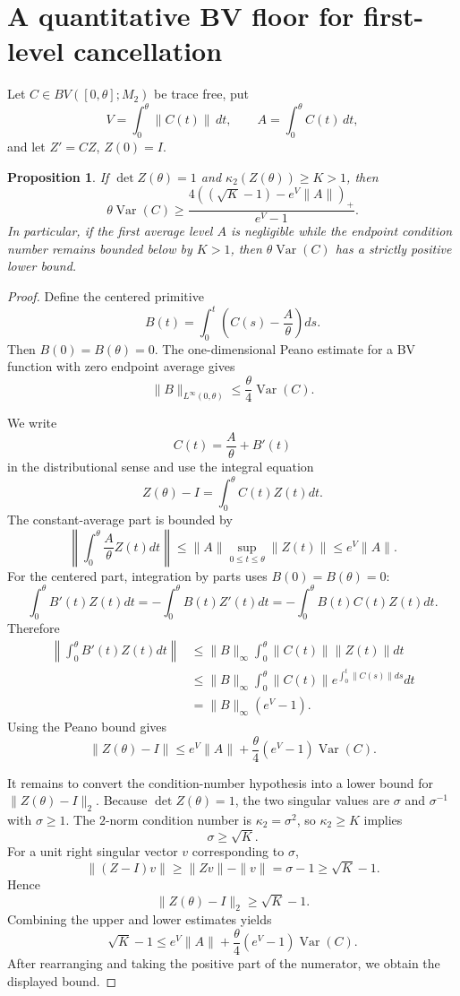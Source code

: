 \documentclass[11pt]{article}
\newtheorem{proposition}[theorem]{Proposition}
\theoremstyle{definition}\newtheorem{definition}[theorem]{Definition}
\theoremstyle{remark}\newtheorem{remark}[theorem]{Remark}
\begin{document}
\section{A quantitative BV floor for first-level cancellation}
Let $C\in BV([0,\theta];M_2)$ be trace free, put
\[
 V=\int_0^\theta\|C(t)\|\,dt,
 \qquad
 A=\int_0^\theta C(t)\,dt,
\]
and let $Z'=CZ$, $Z(0)=I$.

\begin{proposition}\label{prop:bv-floor}
If $\det Z(\theta)=1$ and $\kappa_2(Z(\theta))\ge K>1$, then
\[
\boxed{
\theta\operatorname{Var}(C)
\ge
\frac{4((\sqrt K-1)-e^V\|A\|)_+}{e^V-1}.
}
\]
In particular, if the first average level $A$ is negligible while the endpoint condition number remains bounded below by $K>1$, then $\theta\operatorname{Var}(C)$ has a strictly positive lower bound.
\end{proposition}
\begin{proof}
Define the centered primitive
\[
 B(t)=\int_0^t\left(C(s)-\frac A\theta\right)ds.
\]
Then $B(0)=B(\theta)=0$.  The one-dimensional Peano estimate for a BV function with zero endpoint average gives
\[
 \|B\|_{L^\infty(0,\theta)}
 \le\frac\theta4\operatorname{Var}(C).
\]

We write
\[
 C(t)=\frac A\theta+B'(t)
\]
in the distributional sense and use the integral equation
\[
 Z(\theta)-I=\int_0^\theta C(t)Z(t)dt.
\]
The constant-average part is bounded by
\[
 \left\|\int_0^\theta\frac A\theta Z(t)dt\right\|
 \le \|A\|\sup_{0\le t\le\theta}\|Z(t)\|
 \le e^V\|A\|.
\]
For the centered part, integration by parts uses $B(0)=B(\theta)=0$:
\[
 \int_0^\theta B'(t)Z(t)dt
 =-\int_0^\theta B(t)Z'(t)dt
 =-\int_0^\theta B(t)C(t)Z(t)dt.
\]
Therefore
\[
 \begin{aligned}
 \left\|\int_0^\theta B'(t)Z(t)dt\right\|
 &\le \|B\|_\infty
 \int_0^\theta\|C(t)\|\|Z(t)\|dt\\
 &\le \|B\|_\infty
 \int_0^\theta\|C(t)\|e^{\int_0^t\|C(s)\|ds}dt\\
 &=\|B\|_\infty(e^V-1).
 \end{aligned}
\]
Using the Peano bound gives
\[
 \|Z(\theta)-I\|
 \le e^V\|A\|
 +\frac\theta4(e^V-1)\operatorname{Var}(C).
\]

It remains to convert the condition-number hypothesis into a lower bound for $\|Z(\theta)-I\|_2$.  Because $\det Z(\theta)=1$, the two singular values are $\sigma$ and $\sigma^{-1}$ with $\sigma\ge1$.  The $2$-norm condition number is $\kappa_2=\sigma^2$, so $\kappa_2\ge K$ implies
\[
 \sigma\ge\sqrt K.
\]
For a unit right singular vector $v$ corresponding to $\sigma$,
\[
 \|(Z-I)v\|
 \ge \|Zv\|-\|v\|
 =\sigma-1
 \ge\sqrt K-1.
\]
Hence
\[
 \|Z(\theta)-I\|_2\ge\sqrt K-1.
\]
Combining the upper and lower estimates yields
\[
 \sqrt K-1
 \le e^V\|A\|
 +\frac\theta4(e^V-1)\operatorname{Var}(C).
\]
After rearranging and taking the positive part of the numerator, we obtain the displayed bound.
\end{proof}
\end{document}
